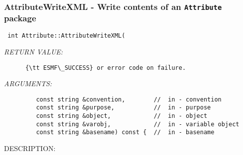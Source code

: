  
\setlength{\oldparskip}{\parskip}
\setlength{\parskip}{1.5ex}
\setlength{\oldparindent}{\parindent}
\setlength{\parindent}{0pt}
\setlength{\oldbaselineskip}{\baselineskip}
\setlength{\baselineskip}{11pt}
 
\def\bv{\begin{verbatim}}
\def\ev{\end{verbatim}}
\def\be{\begin{equation}}
\def\ee{\end{equation}}
\def\bea{\begin{eqnarray}}
\def\eea{\end{eqnarray}}
\def\bi{\begin{itemize}}
\def\ei{\end{itemize}}
\def\bn{\begin{enumerate}}
\def\en{\end{enumerate}}
\def\bd{\begin{description}}
\def\ed{\end{description}}
\def\({\left (}
\def\){\right )}
\def\[{\left [}
\def\]{\right ]}
\def\<{\left  \langle}
\def\>{\right \rangle}
\def\cI{{\cal I}}
\def\diag{\mathop{\rm diag}}
\def\tr{\mathop{\rm tr}}


 

  
 
\mbox{}\hrulefill\
 
\subsubsection [AttributeWriteXML] {AttributeWriteXML - Write contents of an {\tt Attribute} package}


  
\begin{verbatim} int Attribute::AttributeWriteXML(\end{verbatim}{\em RETURN VALUE:}
\begin{verbatim}      {\tt ESMF\_SUCCESS} or error code on failure.\end{verbatim}{\em ARGUMENTS:}
\begin{verbatim}         const string &convention,        //  in - convention
         const string &purpose,           //  in - purpose
         const string &object,            //  in - object
         const string &varobj,            //  in - variable object
         const string &basename) const {  //  in - basename\end{verbatim}
{\sf DESCRIPTION:\\ }


